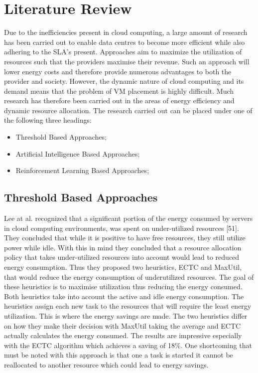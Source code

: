 \documentclass[oneside,12pt]{Classes/RoboticsLaTeX}
\begin{document}
\chapter{Literature Review}
Due to the inefficiencies present in cloud computing, a large amount of research has been carried out to enable data centres to become more efficient while also adhering to the SLA's present. Approaches aim to maximize the utilization of resources such that the providers maximise their revenue. Such an approach will lower energy costs and therefore provide numerous advantages to both the provider and society. However, the dynamic nature of cloud computing and its demand means that the problem of VM placement is highly difficult. Much research has therefore been carried out in the areas of energy efficiency and dynamic resource allocation. The research carried out can be placed under one of the following three headings:

\begin{itemize}
    \item Threshold Based Approaches;
    \item Artificial Intelligence Based Approaches;
    \item Reinforcement Learning Based Approaches;
\end{itemize}

\section{Threshold Based Approaches}
Lee at al. recognized that a significant portion of the energy consumed by servers in cloud computing environments, was spent on under-utilized resources [51]. They concluded that while it is positive to have free resources, they still utilize power while idle. With this in mind they concluded that a resource allocation policy that takes under-utilized resources into account would lead to reduced energy consumption. Thus they proposed two heuristics, ECTC and MaxUtil, that would reduce the energy consumption of underutilized resources. The goal of these heuristics is to maximise utilization thus reducing the energy consumed. Both heuristics take into account the active and idle energy consumption. The heuristics assign each new task to the resources that will require the least energy utilization. This is where the energy savings are made. The two heuristics differ on how they make their decision with MaxUtil taking the average and ECTC actually calculates the energy consumed. The results are impressive especially with the ECTC algorithm which achieves a saving of 18\%. One shortcoming that must be noted with this approach is that one a task is started it cannot be reallocated to another resource which could lead to energy savings. 
\end{document}
